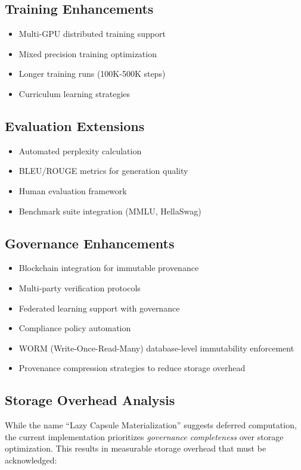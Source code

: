 \documentclass[11pt,a4paper]{article}
\begin{document}
\subsection{Training Enhancements}
\begin{itemize}
    \item Multi-GPU distributed training support
    \item Mixed precision training optimization
    \item Longer training runs (100K-500K steps)
    \item Curriculum learning strategies
\end{itemize}

\subsection{Evaluation Extensions}
\begin{itemize}
    \item Automated perplexity calculation
    \item BLEU/ROUGE metrics for generation quality
    \item Human evaluation framework
    \item Benchmark suite integration (MMLU, HellaSwag)
\end{itemize}

\subsection{Governance Enhancements}
\begin{itemize}
    \item Blockchain integration for immutable provenance
    \item Multi-party verification protocols
    \item Federated learning support with governance
    \item Compliance policy automation
    \item WORM (Write-Once-Read-Many) database-level immutability enforcement
    \item Provenance compression strategies to reduce storage overhead
\end{itemize}

\subsection{Storage Overhead Analysis}

While the name ``Lazy Capsule Materialization'' suggests deferred computation, the current implementation prioritizes \textit{governance completeness} over storage optimization. This results in measurable storage overhead that must be acknowledged:
\end{document}
